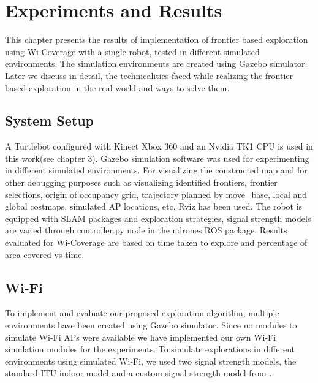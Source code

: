 \chapter{Experiments and Results}
This chapter presents the results of implementation of frontier based exploration using Wi-Coverage with a single robot, tested in different simulated environments. The simulation environments are created using Gazebo simulator. Later we discuss in detail, the technicalities faced while realizing the frontier based exploration in the real world and ways to solve them. 

\section{System Setup}
A Turtlebot configured with Kinect Xbox 360 and an Nvidia TK1 CPU is used in this work(see chapter 3). Gazebo simulation software was used for experimenting in different simulated environments. For visualizing the constructed map and for other debugging purposes such as visualizing identified frontiers, frontier selections, origin of occupancy grid, trajectory planned by move\_base, local and global costmaps, simulated AP locations, etc, Rviz has been used. The robot is equipped with SLAM packages and exploration strategies, signal strength models are varied through controller.py node in the ndrones ROS package. Results evaluated for Wi-Coverage are based on time taken to explore and percentage of area covered vs time. 


\section{Wi-Fi}
To implement and evaluate our proposed exploration algorithm, multiple environments have been created using Gazebo simulator. Since no modules to simulate Wi-Fi APs were available we have implemented our own Wi-Fi simulation modules for the experiments. To simulate explorations in different environments using simulated Wi-Fi, we used two signal strength models, the standard ITU indoor model and a custom signal strength model from \cite{30}.


